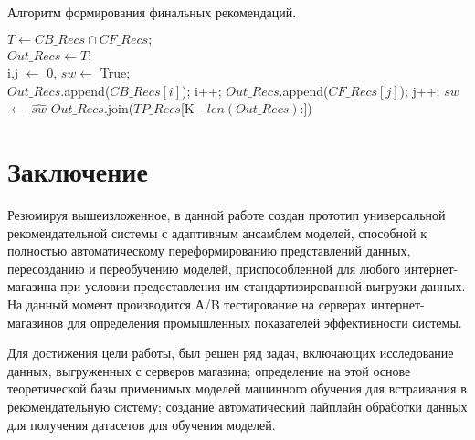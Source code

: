 \documentclass[14pt]{mmcs_article}
\begin{document}
\begin{algorithm}[H]\label{ens:ls:1}
	\caption{Алгоритм формирования финальных рекомендаций.}
	$T \leftarrow  CB\_Recs  \cap  CF\_Recs; $\\
	$Out\_Recs \leftarrow T$;\\
	i,j $\leftarrow$ 0, $sw \leftarrow$ True;\\
	{
		{
			{$Out\_Recs$.append($CB\_Recs[i]$);}
			i++;
		}
		{
			{$Out\_Recs$.append($CF\_Recs[j]$);}
			j++;
		}
		$sw$ $\leftarrow$ $\hat{sw}$
	}
	{
		$Out\_Recs$.join($TP\_Recs$[K - $len(Out\_Recs)$:])
	}
	
\end{algorithm}



\newpage
{}
\section*{Заключение}

Резюмируя вышеизложенное, в данной работе создан прототип универсальной рекомендательной системы с адаптивным ансамблем моделей, способной к полностью автоматическому переформированию представлений данных, пересозданию и переобучению моделей, приспособленной для любого интернет-магазина при условии предоставления им стандартизированной выгрузки данных. На данный момент производится А/B тестирование на серверах интернет-магазинов для определения промышленных показателей эффективности системы. 


Для достижения цели работы, был решен ряд задач, включающих исследование данных, выгруженных с серверов магазина; определение на этой основе теоретической базы применимых моделей машинного обучения для встраивания в рекомендательную систему; создание автоматический пайплайн обработки данных для получения датасетов для обучения моделей.
\end{document}
